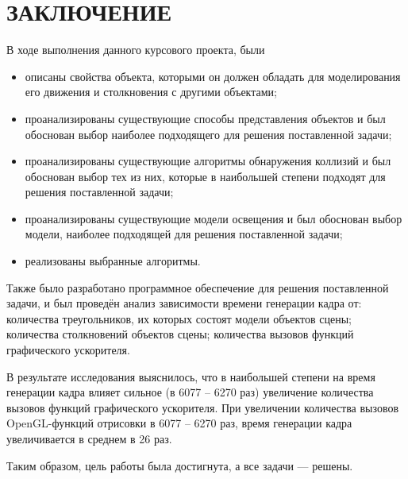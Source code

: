 \section*{ЗАКЛЮЧЕНИЕ}

В ходе выполнения данного курсового проекта, были
\begin{itemize}
    \item описаны свойства объекта, которыми он должен обладать для моделирования его движения и столкновения с другими объектами;
    \item проанализированы существующие способы представления объектов и был обоснован выбор наиболее подходящего для решения поставленной задачи;
    \item проанализированы существующие алгоритмы обнаружения коллизий и был обоснован выбор тех из них, которые в наибольшей степени подходят для решения поставленной задачи;
    \item проанализированы существующие модели освещения и был обоснован выбор модели, наиболее подходящей для решения поставленной задачи;
    \item реализованы выбранные алгоритмы.
\end{itemize}

Также было разработано программное обеспечение для решения поставленной задачи, и был проведён анализ зависимости времени генерации кадра от: количества треугольников, их которых состоят модели объектов сцены; количества столкновений объектов сцены; количества вызовов функций графического ускорителя.

В результате исследования выяснилось, что в наибольшей степени на время генерации кадра влияет сильное (в 6077 -- 6270 раз) увеличение количества вызовов функций графического ускорителя.
При увеличении количества вызовов OpenGL-функций отрисовки в 6077 -- 6270 раз, время генерации кадра увеличивается в среднем в 26 раз.

Таким образом, цель работы была достигнута, а все задачи --- решены.

